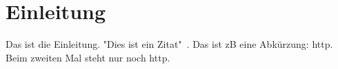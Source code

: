 \chapter{Einleitung}\label{ch:introduction}

Das ist die Einleitung.
"Dies ist ein Zitat"~\cite{dragon-book}.
Das ist \ac{zB} eine Abkürzung: \ac{http}.
Beim zweiten Mal steht nur noch \ac{http}.
